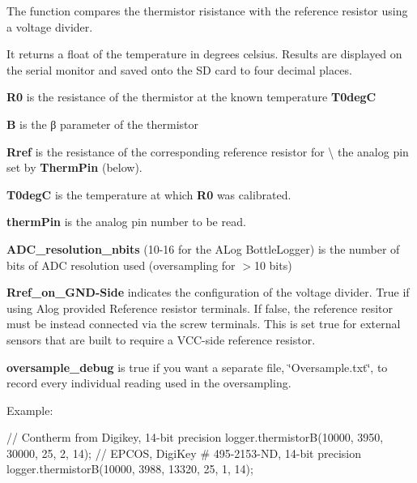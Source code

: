 The function compares the thermistor risistance with the reference resistor using a voltage divider.

It returns a float of the temperature in degrees celsius. Results are displayed on the serial monitor and saved onto the SD card to four decimal places.

{\bfseries R0} is the resistance of the thermistor at the known temperature {\bfseries T0degC} 

{\bfseries B} is the β parameter of the thermistor

{\bfseries Rref} is the resistance of the corresponding reference resistor for \textbackslash{} the analog pin set by {\bfseries Therm\+Pin} (below).

{\bfseries T0degC} is the temperature at which {\bfseries R0} was calibrated.

{\bfseries therm\+Pin} is the analog pin number to be read.

{\bfseries A\+D\+C\+\_\+resolution\+\_\+nbits} (10-\/16 for the A\+Log Bottle\+Logger) is the number of bits of A\+DC resolution used (oversampling for $>$10 bits)

{\bfseries Rref\+\_\+on\+\_\+\+G\+N\+D-\/\+Side} indicates the configuration of the voltage divider. True if using Alog provided Reference resistor terminals. If false, the reference resitor must be instead connected via the screw terminals. This is set true for external sensors that are built to require a V\+C\+C-\/side reference resistor.

{\bfseries oversample\+\_\+debug} is true if you want a separate file, \char`\"{}\+Oversample.\+txt\char`\"{}, to record every individual reading used in the oversampling.

Example\+: 
\begin{DoxyCode}
\textcolor{comment}{// Contherm from Digikey, 14-bit precision}
logger.thermistorB(10000, 3950, 30000, 25, 2, 14);
\textcolor{comment}{// EPCOS, DigiKey # 495-2153-ND, 14-bit precision}
logger.thermistorB(10000, 3988, 13320, 25, 1, 14);
\end{DoxyCode}
